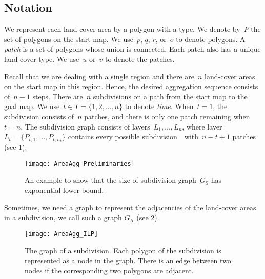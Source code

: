 \documentclass[acmsmall,natbib=false]{acmart}
\begin{document}
\subsection{Notation}
\label{sec:AreaAgg_Notation}

We represent each land-cover area by a polygon with a type.
We denote by~$P$ the set of polygons on the start map.
We use~$p$, $q$, $r$, or~$o$ to denote polygons.
A \emph{patch} is a set of polygons whose union is connected. 
Each patch also has a unique land-cover type.
We use~$u$ or~$v$ to denote the patches.

Recall that we are dealing with a single region and 
there are~$n$ land-cover areas on the start map in this region. 
Hence, the desired aggregation sequence consists of~$n-1$ steps. 
There are~$n$ subdivisions on a path 
from the start map to the goal map. 
We use~$t \in T =\{1,2,\dots,n\}$ to denote \emph{time}. 
When~$t=1$, the subdivision consists of~$n$ patches, 
and there is only one patch remaining when~$t=n$.
The subdivision graph consists of layers~${L}_1,\dots,{L}_n$, 
where layer~${L}_t=\{{P}_{t,1},\dots,{P}_{t,n_t}\}$
contains every possible subdivision~\Pnode\ with~$n-t+1$ patches 
(see \fig\ref{fig:AreaAgg_ExponentialSize}).


\begin{figure}[tb]
\centering
\texttt{[image: AreaAgg\_Preliminaries]}
\caption{An example to show that 
    the size of subdivision graph~$G_\mathrm{S}$
	has exponential lower bound.}
\label{fig:AreaAgg_ExponentialSize}
\end{figure}

Sometimes, we need a graph to represent the adjacencies of
the land-cover areas in a subdivision,
we call such a graph $G_\mathrm{A}$
(see \fig\ref{fig:AreaAgg_Variables_Graph}). 


\begin{figure}[tb]
\centering
\texttt{[image: AreaAgg\_ILP]}
\caption{The graph of a subdivision.
	Each polygon of the subdivision is represented as a node 
	in the graph.
	There is an edge between two nodes
	if the corresponding two polygons are adjacent.
}
\label{fig:AreaAgg_Variables_Graph}
\end{figure} 
\end{document}
